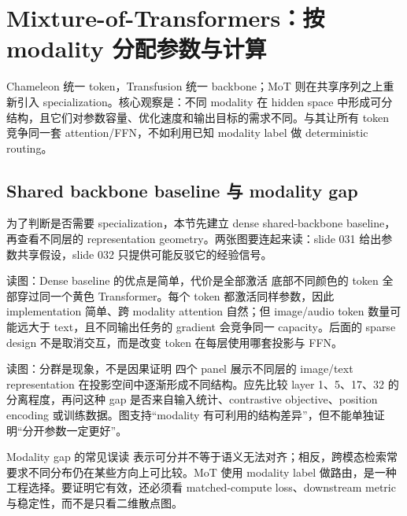 \section{Mixture-of-Transformers：按 modality 分配参数与计算}

Chameleon 统一 token，Transfusion 统一 backbone；MoT 则在共享序列之上重新引入 specialization。核心观察是：不同 modality 在 hidden space 中形成可分结构，且它们对参数容量、优化速度和输出目标的需求不同。与其让所有 token 竞争同一套 attention/FFN，不如利用已知 modality label 做 deterministic routing。

\subsection{Shared backbone baseline 与 modality gap}

为了判断是否需要 specialization，本节先建立 dense shared-backbone baseline，再查看不同层的 representation geometry。两张图要连起来读：slide 031 给出参数共享假设，slide 032 只提供可能反驳它的经验信号。


\begin{knowledgebox}{读图：Dense baseline 的优点是简单，代价是全部激活}
底部不同颜色的 token 全部穿过同一个黄色 Transformer。每个 token 都激活同样参数，因此 implementation 简单、跨 modality attention 自然；但 image/audio token 数量可能远大于 text，且不同输出任务的 gradient 会竞争同一 capacity。后面的 sparse design 不是取消交互，而是改变 token 在每层使用哪套投影与 FFN。
\end{knowledgebox}


\begin{knowledgebox}{读图：分群是现象，不是因果证明}
四个 panel 展示不同层的 image/text representation 在投影空间中逐渐形成不同结构。应先比较 layer 1、5、17、32 的分离程度，再问这种 gap 是否来自输入统计、contrastive objective、position encoding 或训练数据。图支持“modality 有可利用的结构差异”，但不能单独证明“分开参数一定更好”。
\end{knowledgebox}

\begin{warningbox}{Modality gap 的常见误读}
表示可分并不等于语义无法对齐；相反，跨模态检索常要求不同分布仍在某些方向上可比较。MoT 使用 modality label 做路由，是一种工程选择。要证明它有效，还必须看 matched-compute loss、downstream metric 与稳定性，而不是只看二维散点图。
\end{warningbox}

